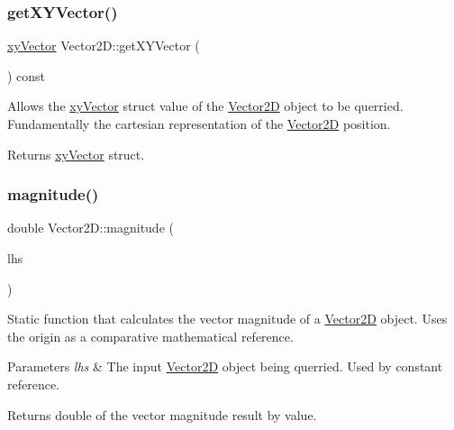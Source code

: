 \subsubsection{\texorpdfstring{get\+X\+Y\+Vector()}{getXYVector()}}
{\footnotesize\ttfamily \hyperlink{structxy_vector}{xy\+Vector} Vector2\+D\+::get\+X\+Y\+Vector (\begin{DoxyParamCaption}{ }\end{DoxyParamCaption}) const}



Allows the \hyperlink{structxy_vector}{xy\+Vector} struct value of the \hyperlink{class_vector2_d}{Vector2D} object to be querried. Fundamentally the cartesian representation of the \hyperlink{class_vector2_d}{Vector2D} position. 

\begin{DoxyReturn}{Returns}
\hyperlink{structxy_vector}{xy\+Vector} struct. 
\end{DoxyReturn}
\mbox{\label{class_vector2_d_a73d35a880a2f3d262b14ac8aaf5914db}} 
\subsubsection{\texorpdfstring{magnitude()}{magnitude()}\hspace{0.1cm}{\footnotesize\ttfamily [1/2]}}
{\footnotesize\ttfamily double Vector2\+D\+::magnitude (\begin{DoxyParamCaption}\item[{const \hyperlink{class_vector2_d}{Vector2D} \&}]{lhs }\end{DoxyParamCaption})\hspace{0.3cm}{\ttfamily [static]}}



Static function that calculates the vector magnitude of a \hyperlink{class_vector2_d}{Vector2D} object. Uses the origin as a comparative mathematical reference. 


\begin{DoxyParams}{Parameters}
{\em lhs} & The input \hyperlink{class_vector2_d}{Vector2D} object being querried. Used by constant reference. \\
\hline
\end{DoxyParams}
\begin{DoxyReturn}{Returns}
double of the vector magnitude result by value. 
\end{DoxyReturn}
\mbox{\label{class_vector2_d_ac7b3cebbfa7c84c9750c30a6c030ffa8}} 
